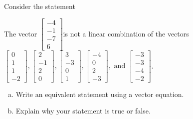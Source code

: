 
\begin{exerciseStatement}


Consider the statement 
\begin{center}\begin{minipage}{0.8\textwidth}
 The vector \( \left[\begin{array}{c}
-4 \\
-1 \\
-7 \\
6
\end{array}\right] \)is not a linear combination of the vectors \( \left[\begin{array}{c}
0 \\
1 \\
1 \\
-2
\end{array}\right] , \left[\begin{array}{c}
2 \\
-1 \\
2 \\
0
\end{array}\right] , \left[\begin{array}{c}
3 \\
-3 \\
0 \\
1
\end{array}\right] , \left[\begin{array}{c}
-4 \\
0 \\
2 \\
-3
\end{array}\right] , \text{ and } \left[\begin{array}{c}
-3 \\
-3 \\
-4 \\
-2
\end{array}\right] \). 
\end{minipage}\end{center}
    


\begin{enumerate}[(a)]
\item  Write an equivalent statement using a vector equation.
\item  Explain why your statement is true or false.
\end{enumerate}
    
\end{exerciseStatement}
    
